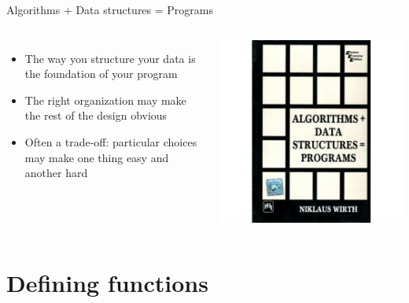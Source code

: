 \documentclass[aspectratio=169,usenames,dvipsnames]{beamer}
\begin{document}
\begin{frame}{Algorithms + Data structures = Programs}
    \begin{columns}
            \begin{itemize}
                \item The way you structure your data is the foundation
                    of your program
                \item The right organization may make the rest of the design
                    obvious
                \item Often a trade-off: particular choices may make one thing
                    easy and another hard
            \end{itemize}
            \includegraphics[height=0.6\textheight]{fig/wirth}
    \end{columns}
\end{frame}




\section{Defining functions}
\frame{\tableofcontents[currentsection]}
\end{document}
